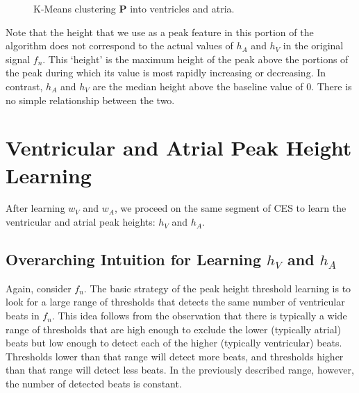 \documentclass[conference]{IEEEtran}
\newcommand{\APW}{\ensuremath{w_A}}
\newcommand{\VPW}{\ensuremath{w_V}}
\newcommand{\APH}{\ensuremath{h_A}}
\newcommand{\VPH}{\ensuremath{h_V}}
\begin{document}
\begin{figure}
	\centering
	\caption{
	K-Means clustering $\mathbf{P}$ into ventricles and atria.}
		\label{fig:kmeans}
\end{figure}

Note that the height that we use as a peak feature in
this portion of the algorithm does not correspond to the
actual values of \APH{} and \VPH{} in the original signal
$f_n$. This `height' is the maximum height of the peak
above the portions of the peak during which its
value is most rapidly increasing or decreasing. 
In contrast, \APH{} and \VPH{} are the median height above the baseline value of 0.
There is no simple relationship between the two.

\section{Ventricular and Atrial Peak Height Learning}
After learning \VPW{} and \APW{}, we proceed on the
same segment of CES to learn the ventricular and atrial peak heights: \VPH{} and \APH{}.

\subsection{Overarching Intuition for Learning \VPH{} and \APH{}}
Again, consider $f_n$. The basic strategy of the peak
height threshold learning is to look for a large range of
thresholds that detects the same number of ventricular beats in
$f_n$. This idea follows from the observation that there
is typically a wide range of thresholds that are high
enough to exclude the lower (typically atrial) beats but
low enough to detect each of the higher (typically
ventricular) beats. Thresholds
lower than that range will detect more beats, and
thresholds higher than that range will detect less beats. In the previously described range, however,
the number of detected beats is constant.
\end{document}
